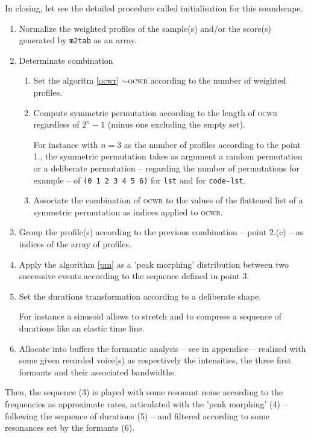 \bigskip
In closing, let see the detailed procedure called initialisation for this soundscape. 

\begin{enumerate}
\label{m2tprecedure}
 \item Normalize the weighted profiles of the sample(s) and/or the score(s) generated by \texttt{m2tab} 
 as an array.
  \item Determinate combination
  \begin{enumerate}
  \item Set the algoritm \ref{ocwr} $\sim$\textsc{ocwr} according to the number of weighted profiles.
 
  \item Compute symmetric permutation according to the length of \textsc{ocwr} regardless of $2^n-1$ (minus one excluding the empty set).
  
  For instance with $n=3$ as the number of profiles according to the point 1., the symmetric permutation takes as argument a random permutation or a deliberate permutation -- regarding the number of permutations for example -- of \texttt{(0 1 2 3 4 5 6)} for \texttt{lst} and for \texttt{code-lst}.
  \item Associate the combination of \textsc{ocwr} to the values of the flattened list of a symmetric permutation as indices applied to \textsc{ocwr}.
\end{enumerate}
\item Group the profile(s) according to the previous combination -- point 2.(c) -- as indices of the array of profiles.
\item Apply the algorithm \ref{pm} as a 'peak morphing' distribution between two successive events according to the sequence defined in point 3.
\item Set the durations transformation according to a deliberate shape.

For instance a sinusoid allows to stretch and to compress a sequence of durations like an elastic time line.
\item Allocate into buffers the formantic analysis -- see  in appendice  -- realized with some given recorded voice(s) as respectively the intensities, the three first formants and their associated bandwidths.
\end{enumerate}
Then, the sequence (3) is played with some resonant noise according to the frequencies as approximate rates, articulated with the 'peak morphing' (4) -- following the sequence of durations (5) -- and filtered according to some resonances set by the formants (6).

